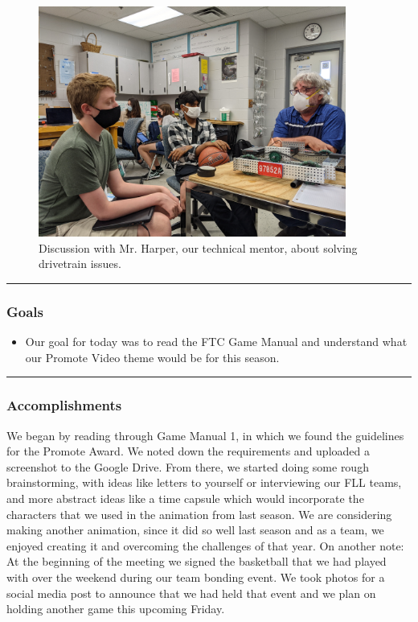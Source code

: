 \begin{figure}[htp]
\centering
\includegraphics[width=0.9\textwidth, angle=0]{Meetings/September/09-21-21/09-21-21 1.jpg}
\caption{Discussion with Mr. Harper, our technical mentor, about solving drivetrain issues.}
\label{fig:092122_1}
\end{figure}

\noindent\hfil\rule{\textwidth}{.4pt}\hfil
\subsubsection*{Goals}
\begin{itemize}
    \item Our goal for today was to read the FTC Game Manual and understand what our Promote Video theme would be for this season.  

\end{itemize} 

\noindent\hfil\rule{\textwidth}{.4pt}\hfil

\subsubsection*{Accomplishments}
We began by reading through Game Manual 1, in which we found the guidelines for the Promote Award. We noted down the requirements and uploaded a screenshot to the Google Drive. From there, we started doing some rough brainstorming, with ideas like letters to yourself or interviewing our FLL teams, and more abstract ideas like a time capsule which would incorporate the characters that we used in the animation from last season. We are considering making another animation, since it did so well last season and as a team, we enjoyed creating it and overcoming the challenges of that year. 
On another note: At the beginning of the meeting we signed the basketball that we had played with over the weekend during our team bonding event. We took photos for a social media post to announce that we had held that event and we plan on holding another game this upcoming Friday.

